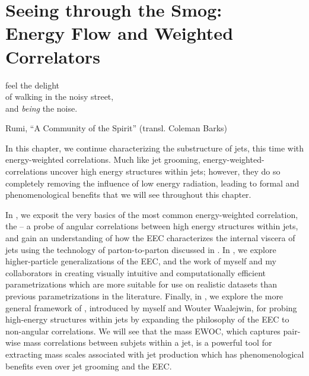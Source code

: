 \chapter[Seeing through the Smog:\\\phantom{Chapter 5:|}Energy Flow and Weighted Correlations]{Seeing through the Smog:\hfill\\Energy Flow and Weighted Correlators}

\label{chap:ewocs}

\epigraph{feel the delight\\of walking in the noisy street,\\and \textit{being} the noise.}{Rumi, ``A Community of the Spirit'' (transl. Coleman Barks)}



In this chapter, we continue characterizing the substructure of jets, this time with energy-weighted correlations.
%
Much like jet grooming, \gls{energy-weighted-correlations} uncover high energy structures within jets;
%
however, they do so completely removing the influence of low energy radiation, leading to formal and phenomenological benefits that we will see throughout this chapter.

In , we exposit the very basics of the most common energy-weighted correlation, the  -- a probe of angular correlations between high energy structures within jets, and gain an understanding of how the EEC characterizes the internal viscera of jets using the technology of \gls{parton-to-parton} discussed in .
%
In , we explore higher-particle generalizations of the EEC, and the work of myself and my collaborators in creating visually intuitive and computationally efficient parametrizations which are more suitable for use on realistic datasets than previous parametrizations in the literature.
%
Finally, in , we explore the more general framework of , introduced by myself and Wouter Waalejwin, for probing high-energy structures within jets by expanding the philosophy of the EEC to non-angular correlations.
%
We will see that the mass EWOC, which captures pair-wise mass correlations between subjets within a jet, is a powerful tool for extracting mass scales associated with jet production which has phenomenological benefits even over jet grooming and the EEC.



